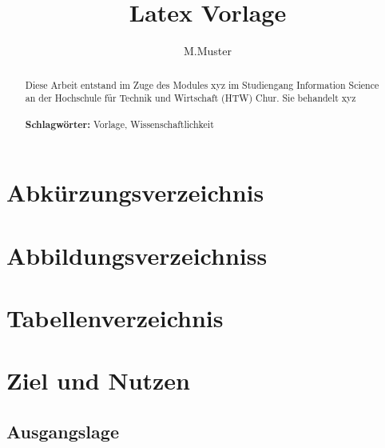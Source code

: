 \documentclass{htwchur}
\title{Latex Vorlage}
\author{M.Muster}
\begin{document}



\begin{abstract}
Diese Arbeit entstand im Zuge des Modules xyz
im Studiengang Information Science an der Hochschule für Technik und Wirtschaft (HTW) Chur. Sie behandelt xyz 
\\\\
\textbf{Schlagwörter: }Vorlage, Wissenschaftlichkeit

\end{abstract}



\newpage
{}
\setcounter{page}{2}
\tableofcontents

\newpage
\section*{Abkürzungsverzeichnis}

\begin{acronym}[Bash]
\end{acronym}

\newpage

\section*{Abbildungsverzeichniss}
\setlength{\cftfignumwidth}{3cm}
\setlength{\cftfigindent}{0cm}
\renewcommand{\cftfigpresnum}{Abbildung }
\renewcommand{\cftfigaftersnum}{:}
\makeatletter
{}%
\makeatother


\section*{Tabellenverzeichnis}
\setlength{\cfttabindent}{0cm}
\setlength{\cfttabnumwidth}{3cm}
\renewcommand{\cfttabpresnum}{Tabelle }
\renewcommand{\cfttabaftersnum}{:}
\makeatletter
{}%
\makeatother

\newpage
{}
\setcounter{page}{1}

\section{Ziel und Nutzen} \label{sec:ziel_und_nutzen}
\subsection{Ausgangslage} \label{sec:ausgangslage}
\lipsum[1-1]
\end{document}
